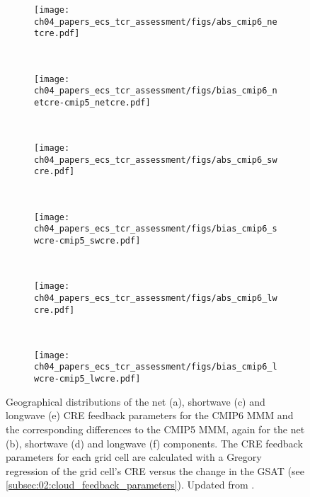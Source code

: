 \begin{figure}[!t]
  \centering
  \begin{subfigure}[t]{\SmallSubfigureWidth{}}
    \texttt{[image: 
      ch04\_papers\_ecs\_tcr\_assessment/figs/abs\_cmip6\_netcre.pdf]}
    \caption{}
    \label{fig:04:cloud_feedback_parameters:a}
  \end{subfigure}
  ~
  \begin{subfigure}[t]{\SmallSubfigureWidth{}}
    \texttt{[image: 
      ch04\_papers\_ecs\_tcr\_assessment/figs/bias\_cmip6\_netcre-cmip5\_netcre.pdf]}
    \caption{}
    \label{fig:04:cloud_feedback_parameters:b}
  \end{subfigure}
  \\
  \begin{subfigure}[t]{\SmallSubfigureWidth{}}
    \texttt{[image: 
      ch04\_papers\_ecs\_tcr\_assessment/figs/abs\_cmip6\_swcre.pdf]}
    \caption{}
    \label{fig:04:cloud_feedback_parameters:c}
  \end{subfigure}
  ~
  \begin{subfigure}[t]{\SmallSubfigureWidth{}}
    \texttt{[image: 
      ch04\_papers\_ecs\_tcr\_assessment/figs/bias\_cmip6\_swcre-cmip5\_swcre.pdf]}
    \caption{}
    \label{fig:04:cloud_feedback_parameters:d}
  \end{subfigure}
  \\
  \begin{subfigure}[t]{\SmallSubfigureWidth{}}
    \texttt{[image: 
      ch04\_papers\_ecs\_tcr\_assessment/figs/abs\_cmip6\_lwcre.pdf]}
    \caption{}
    \label{fig:04:cloud_feedback_parameters:e}
  \end{subfigure}
  ~
  \begin{subfigure}[t]{\SmallSubfigureWidth{}}
    \texttt{[image: 
      ch04\_papers\_ecs\_tcr\_assessment/figs/bias\_cmip6\_lwcre-cmip5\_lwcre.pdf]}
    \caption{}
    \label{fig:04:cloud_feedback_parameters:f}
  \end{subfigure}
  \caption{Geographical distributions of the net (a), shortwave (c) and
    longwave (e) \acf{CRE} feedback parameters for the \acs{CMIP}6 \acf{MMM}
    and the corresponding differences to the \acs{CMIP}5 \acs{MMM}, again for
    the net (b), shortwave (d) and longwave (f) components. The \acs{CRE}
    feedback parameters for each grid cell are calculated with a Gregory
    regression of the grid cell's \acs{CRE} versus the change in the
    \acl{GSAT} (see \cref{subsec:02:cloud_feedback_parameters}). Updated from
    \textcite{Bock2020}.}
  \label{fig:04:cloud_feedback_parameters}
\end{figure}

